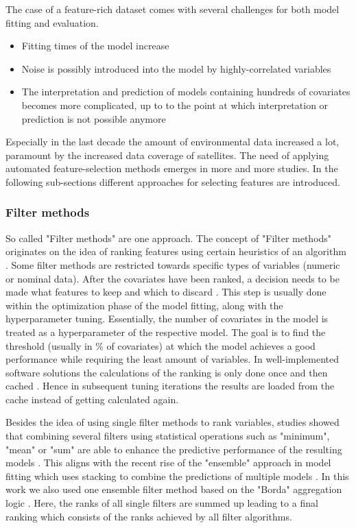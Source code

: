 \documentclass[review]{elsarticle}
\begin{document}
The case of a feature-rich dataset comes with several challenges for both model fitting and evaluation.

\begin{itemize}
  \item Fitting times of the model increase
  \item Noise is possibly introduced into the model by highly-correlated variables \citep{johnstoneiainm2009}
  \item The interpretation and prediction of models containing hundreds of covariates becomes more complicated, up to to the point at which interpretation or prediction is not possible anymore \citep{johnstoneiainm2009}
\end{itemize}

Especially in the last decade the amount of environmental data increased a lot, paramount by the increased data coverage of satellites.
The need of applying automated feature-selection methods emerges in more and more studies.
In the following sub-sections different approaches for selecting features are introduced.

\subsubsection{Filter methods}

So called "Filter methods" are one approach.
The concept of "Filter methods" originates on the idea of ranking features using certain heuristics of an algorithm \citep{chandrashekar2014}.
Some filter methods are restricted towards specific types of variables (numeric or nominal data).
After the covariates have been ranked, a decision needs to be made what features to keep and which to discard \citep{drotar2015}.
This step is usually done within the optimization phase of the model fitting, along with the hyperparameter tuning.
Essentially, the number of covariates in the model is treated as a hyperparameter of the respective model.
The goal is to find the threshold (usually in \% of covariates) at which the model achieves a good performance while requiring the least amount of variables.
In well-implemented software solutions the calculations of the ranking is only done once and then cached \citep{mlr}.
Hence in subsequent tuning iterations the results are loaded from the cache instead of getting calculated again.

Besides the idea of using single filter methods to rank variables, studies showed that combining several filters using statistical operations such as "minimum", "mean" or "sum" are able to enhance the predictive performance of the resulting models \citep{abeel2010, drotar2017a}.
This aligns with the recent rise of the "ensemble" approach in model fitting which uses stacking to combine the predictions of multiple models \citep{polikar2012, feurer2015}.
In this work we also used one ensemble filter method based on the "Borda" aggregation logic \citep{drotar2017a}.
Here, the ranks of all single filters are summed up leading to a final ranking which consists of the ranks achieved by all filter algorithms.
\end{document}
